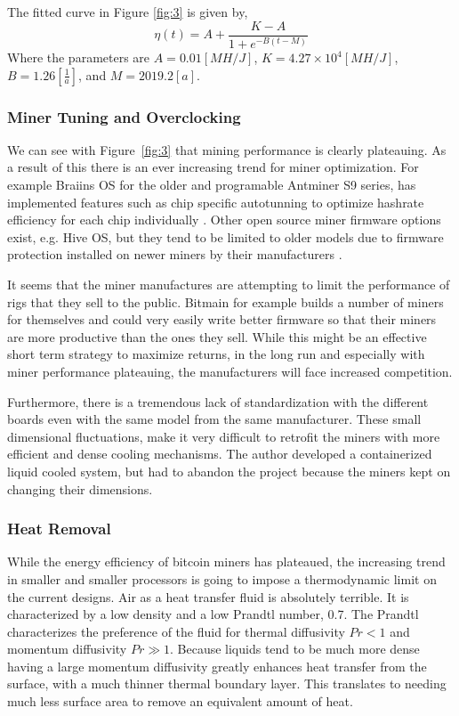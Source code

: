 \documentclass[runningheads]{llncs}
\begin{document}
The fitted curve in Figure \ref{fig:3} is given by,
\begin{equation}
    \eta(t) = A + \frac{K - A}{1 + e^{-B(t - M)}}
\end{equation}
Where the parameters are $A = 0.01 [MH/J]$, $K = 4.27\times 10^4 [MH/J]$,  $B = 1.26 [\frac{1}{a}]$, and $ M = 2019.2 [a]$.


\subsubsection{Miner Tuning and Overclocking}
We can see with Figure~\ref{fig:3} that mining performance is clearly plateauing.
As a result of this there is an ever increasing trend for miner optimization.
For example Braiins OS for the older and programable Antminer S9 series, has implemented features such as chip specific autotunning to optimize hashrate efficiency for each chip individually \cite{braiins2021autotuning}.
Other open source miner firmware options exist, e.g. Hive OS, but they tend to be limited to older models due to firmware protection installed on newer miners by their manufacturers \cite{hiveos2020update}.

It seems that the miner manufactures are attempting to limit the performance of rigs that they sell to the public.
Bitmain for example builds a number of miners for themselves and could very easily write better firmware so that their miners are more productive than the ones they sell.
While this might be an effective short term strategy to maximize returns, in the long run and especially with miner performance plateauing, the manufacturers will face increased competition.

Furthermore, there is a tremendous lack of standardization with the different boards even with the same model from the same manufacturer.
These small dimensional fluctuations, make it very difficult to retrofit the miners with more efficient and dense cooling mechanisms.
The author developed a containerized liquid cooled system, but had to abandon the project because the miners kept on changing their dimensions.

\subsubsection{Heat Removal}
While the energy efficiency of bitcoin miners has plateaued, the increasing trend in smaller and smaller processors is going to impose a thermodynamic limit on the current designs.
Air as a heat transfer fluid is absolutely terrible.
It is characterized by a low density and a low Prandtl number, 0.7.
The Prandtl characterizes the preference of the fluid for thermal diffusivity $Pr < 1$ and momentum diffusivity $Pr \gg 1$.
Because liquids tend to be much more dense having a large momentum diffusivity greatly enhances heat transfer from the surface, with a much thinner thermal boundary layer.
This translates to needing much less surface area to remove an equivalent amount of heat.
\end{document}
